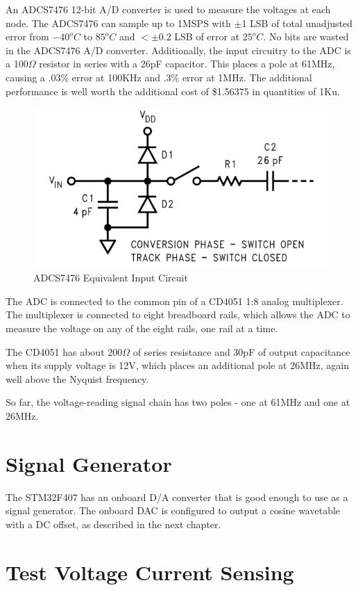 \documentclass[11pt,twoside]{mitthesis}
\begin{document}
An ADCS7476 12-bit A/D converter is used to measure the voltages at each node.
The ADCS7476 can sample up to 1MSPS with $\pm$1 LSB of total unadjusted error from $-40^o C$ to $85^o C$ and $<\pm 0.2$ LSB of error at $25^o C$.
No bits are wasted in the ADCS7476 A/D converter.
Additionally, the input circuitry to the ADC is a 100$\Omega$ resistor in series with a 26pF capacitor.  
This places a pole at 61MHz, causing a .03\% error at 100KHz and .3\% error at 1MHz.
The additional performance is well worth the additional cost of \$1.56375 in quantities of 1Ku.

\begin{figure}[h!]
  \begin{center}
      \includegraphics[width=.5\textwidth]{../adc-input-equiv.png}
      \caption{ADCS7476 Equivalent Input Circuit}
  \end{center}
\end{figure}


The ADC is connected to the common pin of a CD4051 1:8 analog multiplexer.
The multiplexer is connected to eight breadboard rails, which allows the ADC to measure the voltage on any of the eight rails, one rail at a time.

The CD4051 has about $200\Omega$ of series resistance and 30pF of output capacitance when its supply voltage is 12V, which places an additional pole at 26MHz, again well above the Nyquist frequency.

So far, the voltage-reading signal chain has two poles - one at 61MHz and one at 26MHz.

\section{Signal Generator}

The STM32F407 has an onboard D/A converter that is good enough to use as a signal generator.
The onboard DAC is configured to output a cosine wavetable with a DC offset, as described in the next chapter.

\section{Test Voltage Current Sensing}
\end{document}

